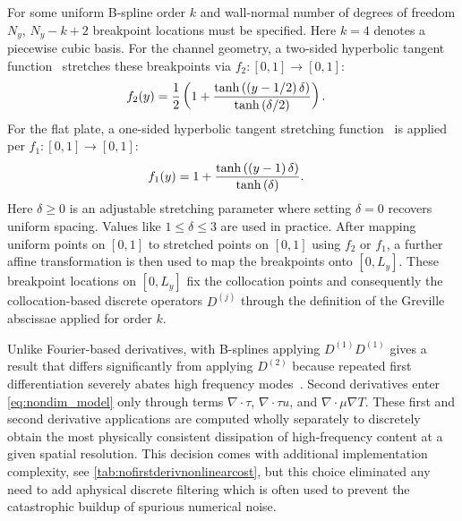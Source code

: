 For some uniform B-spline order $k$ and wall-normal number of degrees of
freedom $N_y$, $N_y - k + 2$ breakpoint locations must be specified.  Here
$k=4$ denotes a piecewise cubic basis.  For the channel geometry,
a two-sided hyperbolic tangent function~\citep{Vinokur1983Onedimensional}
stretches these breakpoints via
$f_2:\left[0,1\right]\to\left[0,1\right]$:
\begin{align}\label{eq:htstretch2}
  f_2\!\left(y\right) &= \frac{1}{2}\left(1 + \frac{%
      \tanh\left(\left(y-1/2\right)\delta\right)
  }{%
      \tanh\left(\delta/2\right)
  }\right).
\end{align}
For the flat plate, a one-sided hyperbolic tangent stretching
function~\citep{Vinokur1983Onedimensional} is applied per
$f_1:\left[0,1\right]\to\left[0,1\right]$:
\begin{align}\label{eq:htstretch1}
  f_1\!\left(y\right) &= 1 + \frac{%
      \tanh\left(\left(y-1\right)\delta\right)
  }{%
      \tanh\left(\delta\right)
  }.
\end{align}
Here $\delta\geq{}0$ is an adjustable stretching parameter where setting
$\delta=0$ recovers uniform spacing.  Values like $1\leq{}\delta\leq{}3$ are
used in practice.  After mapping uniform points on $\left[0,1\right]$ to
stretched points on $\left[0,1\right]$ using $f_2$ or $f_1$, a further affine
transformation is then used to map the breakpoints onto $\left[0, L_y\right]$.
These breakpoint locations on $\left[0, L_y\right]$ fix the collocation points
and consequently the collocation-based discrete operators $D^{(j)}$ through the
definition of the Greville abscissae applied for order $k$.

Unlike Fourier-based derivatives, with B-splines applying $D^{(1)}D^{(1)}$ gives
a result that differs significantly from applying $D^{(2)}$ because repeated first
differentiation severely abates high frequency
modes~\citep[Figures~2--3]{Kwok2001}.  Second derivatives enter
\eqref{eq:nondim_model} only through terms $\nabla\cdot\tau$, $\nabla\cdot\tau{}u$,
and $\nabla\cdot\mu\nabla{}T$.  These first and second derivative applications
are computed wholly separately to discretely obtain the most physically consistent
dissipation of high-frequency content at a given spatial resolution.  This
decision comes with additional implementation complexity, see
\autoref{tab:nofirstderivnonlinearcost}, but this choice
eliminated any need to add aphysical discrete filtering which is often used to
prevent the catastrophic buildup of spurious numerical noise.

